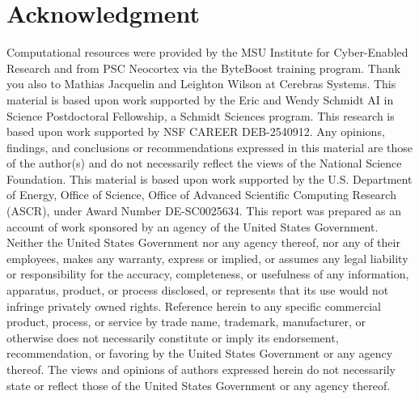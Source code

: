 \section*{Acknowledgment}

Computational resources were provided by the MSU Institute for Cyber-Enabled Research and from PSC Neocortex via the ByteBoost training program.
Thank you also to Mathias Jacquelin and Leighton Wilson at Cerebras Systems.
This material is based upon work supported by the Eric and Wendy Schmidt AI in Science Postdoctoral Fellowship, a Schmidt Sciences program.
This research is based upon work supported by NSF CAREER DEB-2540912.
Any opinions, findings, and conclusions or recommendations expressed in this material are those of the author(s) and do not necessarily reflect the views of the National Science Foundation.
This material is based upon work supported by the U.S. Department of Energy, Office of Science, Office of Advanced Scientific Computing Research (ASCR), under Award Number DE-SC0025634.
This report was prepared as an account of work sponsored by an agency of the United States Government.
Neither the United States Government nor any agency thereof, nor any of their employees, makes any warranty, express or implied, or assumes any legal liability or responsibility for the accuracy, completeness, or usefulness of any information, apparatus, product, or process disclosed, or represents that its use would not infringe privately owned rights.
Reference herein to any specific commercial product, process, or service by trade name, trademark, manufacturer, or otherwise does not necessarily constitute or imply its endorsement, recommendation, or favoring by the United States Government or any agency thereof.
The views and opinions of authors expressed herein do not necessarily state or reflect those of the United States Government or any agency thereof.
